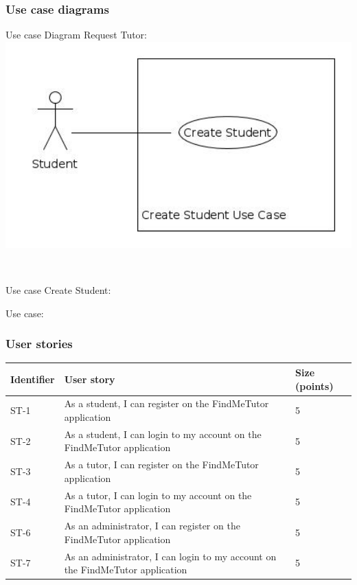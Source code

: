 \documentclass[12pt]{article}
\begin{document}
{		

	\newpage	
\subsubsection{Use case diagrams}
Use case Diagram Request Tutor:
		\centering
		\includegraphics[width=140mm]{./Use_Cases/Create_Student.jpg}
		
\

Use case Create Student:

\newpage
Use case:

\newpage
\subsubsection{User stories}
{
\centering
\begin{longtable}{| l | p{10cm}| l |}
			\hline			
			\textbf{Identifier} & \textbf{User story} & \textbf{Size (points)}
			
			\\ \hline ST-1 & As a student, I can  register on the FindMeTutor application  & 5 
			\\ \hline ST-2 & As a student, I can  login to my account on the FindMeTutor application  & 5 
			\\ \hline ST-3 & As a tutor, I can  register on the FindMeTutor application  & 5 
																\\ \hline ST-4 & As a tutor, I can  login to my account on the FindMeTutor application  & 5 
																\\ \hline ST-6 & As an administrator, I can  register on the FindMeTutor application  & 5 
													\\ \hline ST-7 & As an administrator, I can  login to my account on the FindMeTutor application  & 5 			


\end{longtable}}}
\end{document}
